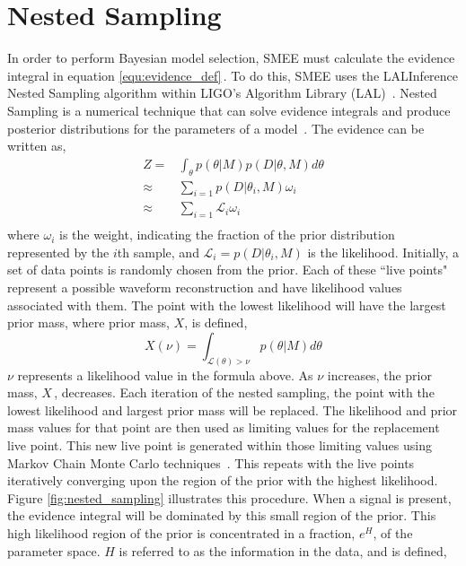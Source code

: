 \section{Nested Sampling}

In order to perform Bayesian model selection, SMEE must calculate the evidence integral in equation \ref{equ:evidence_def}\,. To do this, SMEE uses the LALInference Nested Sampling algorithm within LIGO's Algorithm Library (LAL)~\cite{thesis_jade, veitch:15}. Nested Sampling is a numerical technique that can solve evidence integrals and produce posterior distributions for the parameters of a model~\cite{thesis_josh}. The evidence can be written as,
\begin{equation}
\label{equ:evidence_algrebra}
    \begin{split}
    Z =& \int_{\theta} p(\theta|M)p(D|\theta,M)d\theta \\
    \approx& \sum_{i=1} p(D|\theta_{i},M)\omega_{i} \\
    \approx& \sum_{i=1} \mathcal{L}_{i}\omega_{i} \\
    \end{split}
\end{equation}
where $\omega_{i}$ is the weight, indicating the fraction of the prior distribution represented by the $i$th sample, and $\mathcal{L}_{i} = p(D|\theta_{i},M)$ is the likelihood. Initially, a set of data points is randomly chosen from the prior. Each of these ``live points" represent a possible waveform reconstruction and have likelihood values associated with them. The point with the lowest likelihood will have the largest prior mass, where prior mass, $X$, is defined,
\begin{equation}
\label{equ_prior_mass}
    X(\nu) = \int_{\mathcal{L}(\theta)>\nu} p(\theta|M)d\theta
\end{equation}
$\nu$ represents a likelihood value in the formula above. As $\nu$ increases, the prior mass, $X\,$, decreases. Each iteration of the nested sampling, the point with the lowest likelihood and largest prior mass will be replaced. The likelihood and prior mass values for that point are then used as limiting values for the replacement live point. This new live point is generated within those limiting values using Markov Chain Monte Carlo techniques~\cite{sivia1996data, thesis_jade}. This repeats with the live points iteratively converging upon the region of the prior with the highest likelihood. Figure \ref{fig:nested_sampling} illustrates this procedure. When a signal is present, the evidence integral will be dominated by this small region of the prior. This high likelihood region of the prior is concentrated in a fraction, $e^{H}$, of the parameter space. $H$ is referred to as the information in the data, and is defined,
